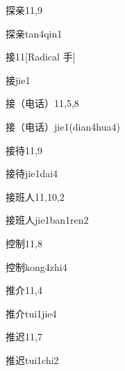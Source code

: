 \begin{entry}{探亲}{11,9}
  \begin{phonetics}{探亲}{tan4qin1}
  \end{phonetics}
\end{entry}

\begin{entry}{接}{11}[Radical 手]
  \begin{phonetics}{接}{jie1}
  \end{phonetics}
\end{entry}

\begin{entry}{接（电话）}{11,5,8}
  \begin{phonetics}{接（电话）}{jie1(dian4hua4)}
  \end{phonetics}
\end{entry}

\begin{entry}{接待}{11,9}
  \begin{phonetics}{接待}{jie1dai4}
  \end{phonetics}
\end{entry}

\begin{entry}{接班人}{11,10,2}
  \begin{phonetics}{接班人}{jie1ban1ren2}
  \end{phonetics}
\end{entry}

\begin{entry}{控制}{11,8}
  \begin{phonetics}{控制}{kong4zhi4}
  \end{phonetics}
\end{entry}

\begin{entry}{推介}{11,4}
  \begin{phonetics}{推介}{tui1jie4}
  \end{phonetics}
\end{entry}

\begin{entry}{推迟}{11,7}
  \begin{phonetics}{推迟}{tui1chi2}
  \end{phonetics}
\end{entry}

